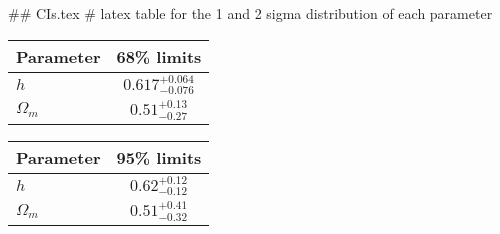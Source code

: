 ## CIs.tex
# latex table for the 1 and 2 sigma distribution of each parameter

\begin{tabular} { l  c}
 Parameter &  68\% limits\\
\hline
{\boldmath$h              $} & $0.617^{+0.064}_{-0.076}   $\\
{\boldmath$\Omega_m       $} & $0.51^{+0.13}_{-0.27}      $\\
\hline
\end{tabular}

\begin{tabular} { l  c}
 Parameter &  95\% limits\\
\hline
{\boldmath$h              $} & $0.62^{+0.12}_{-0.12}      $\\
{\boldmath$\Omega_m       $} & $0.51^{+0.41}_{-0.32}      $\\
\hline
\end{tabular}
